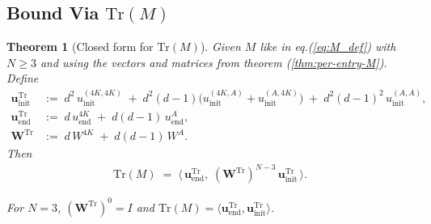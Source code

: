 \documentclass[12pt,a4paper]{article}
\newtheorem{theorem}{Theorem}[section]
\begin{document}
\subsection{Bound Via $\mathrm{Tr}(M)$}
\begin{theorem}[Closed form for $\mathrm{Tr}(M)$]
Given $M$ like in eq.(\ref{eq:M_def}) with $N\ge 3$ and using the vectors and matrices from theorem (\ref{thm:per-entry-M}).
Define
\begin{align}
\mathbf{u}^{\mathrm{Tr}}_{\mathrm{init}}
&:=\;d^{2}\,u^{(4K,4K)}_{\mathrm{init}}
\;+\;d^{2}(d-1)\bigl(u^{(4K,A)}_{\mathrm{init}}+u^{(A,4K)}_{\mathrm{init}}\bigr)
\;+\;d^{2}(d-1)^{2}\,u^{(A,A)}_{\mathrm{init}},\\[2pt]
\mathbf{u}^{\mathrm{Tr}}_{\mathrm{end}}
&:=\;d\,u^{4K}_{\mathrm{end}}\;+\;d(d-1)\,u^{A}_{\mathrm{end}},\\[2pt]
\mathbf{W}^{\mathrm{Tr}}
&:=\;d\,W^{4K}\;+\;d(d-1)\,W^{A}.
\end{align}
Then
\begin{align}
\mathrm{Tr}(M)\;=\;\bigl\langle\,\mathbf{u}^{\mathrm{Tr}}_{\mathrm{end}},\;
(\mathbf{W}^{\mathrm{Tr}})^{N-3}\,\mathbf{u}^{\mathrm{Tr}}_{\mathrm{init}}\,\bigr\rangle. \label{def:tr_formula}
\end{align}


For $N=3$, $(\mathbf{W}^{\mathrm{Tr}})^{0}=I$ and
$\mathrm{Tr}(M)=\langle\mathbf{u}^{\mathrm{Tr}}_{\mathrm{end}},\mathbf{u}^{\mathrm{Tr}}_{\mathrm{init}}\rangle$.
\end{theorem}
\end{document}
